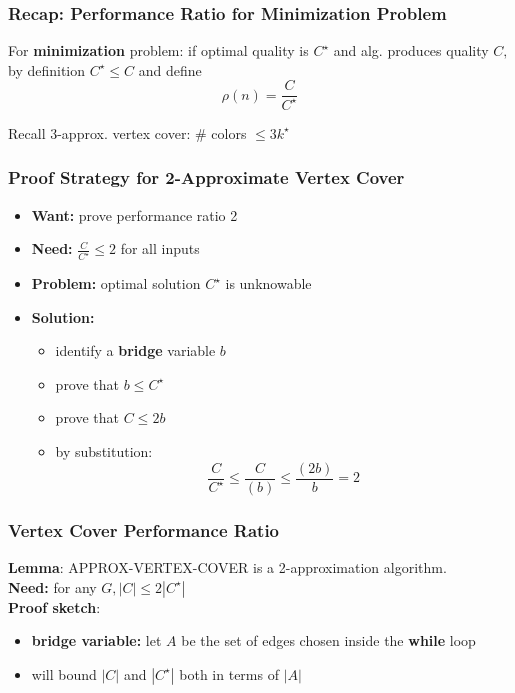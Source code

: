 \documentclass[10pt,aspectratio=169]{beamer}
\begin{document}
\begin{frame} \frametitle{Recap: Performance Ratio for Minimization Problem}
  For \textbf{minimization} problem: if optimal quality is $C^\star$ and alg. produces
      quality $C,$ by definition $C^\star \leq C$ and define
      \[ \rho(n) = \frac{C}{C^\star} \]
  
  Recall 3-approx. vertex cover: \# colors $\leq 3 k^\star$
\end{frame}

\begin{frame} \frametitle{Proof Strategy for 2-Approximate Vertex Cover}
\begin{itemize}
  \item \textbf{Want:} prove performance ratio 2
  \item \textbf{Need:}  $\frac{C}{C^\star} \leq 2$ for all inputs
  \item \textbf{Problem:} optimal solution $C^\star$ is unknowable
  \item \textbf{Solution:}
    \begin{itemize}
      \item identify a \textbf{bridge} variable $b$
      \item prove that $b \leq C^\star$
      \item prove that $C \leq 2 b$
      \item by substitution:
        \[ \frac{C}{C^\star} \leq \frac{C}{(b)} \leq \frac{(2b)}{b} = 2 \]
    \end{itemize}
\end{itemize}
\end{frame}

\begin{frame} \frametitle{Vertex Cover Performance Ratio}
\textbf{Lemma}: APPROX-VERTEX-COVER is a 2-approximation algorithm. \\
\textbf{Need:} for any $G, |C| \leq 2 |C^\star|$ \\
\textbf{Proof sketch}:
\begin{itemize}
  \item \textbf{bridge variable:} let $A$ be the set of edges chosen inside the \textbf{while} loop
  \item will bound $|C|$ and $|C^\star|$ both in terms of $|A|$
\end{itemize}
\end{frame}
  
\end{document}
